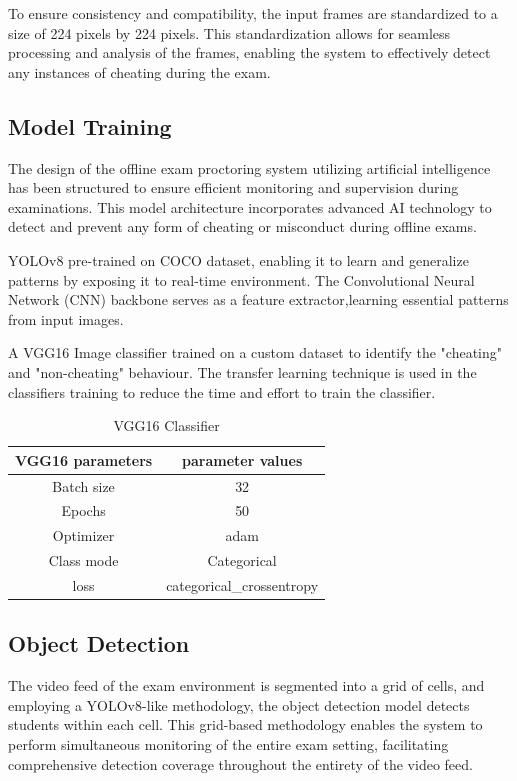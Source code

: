 \documentclass[conference]{IEEEtran}
\begin{document}
To ensure consistency and compatibility, the input frames are standardized to a size of 224 pixels by 224 pixels. This standardization allows for seamless processing and analysis of the frames, enabling the system to effectively detect any instances of cheating during the exam.


\subsection{Model Training}
The design of the offline exam proctoring system utilizing artificial intelligence has been structured to ensure efficient monitoring and supervision during examinations. This model architecture incorporates advanced AI technology to detect and prevent any form of cheating or misconduct during offline exams.

YOLOv8 pre-trained on COCO dataset, enabling it to learn and generalize patterns by exposing it to real-time environment. The Convolutional Neural Network (CNN) backbone serves as a feature extractor,learning essential patterns from input images.

A VGG16 Image classifier trained on a custom dataset to identify the "cheating" and "non-cheating" behaviour. The transfer learning technique is used in the classifiers training to reduce the time and effort to train the classifier.
\begin{table}[htbp]
\caption{VGG16 Classifier}
\label{tab2} %
\begin{center}
\begin{tabular}{|c|c|}
\hline
\textbf{VGG16 parameters} & \textbf{parameter values} \\ %
\hline
Batch size & 32 \\ %
\hline
Epochs& 50 \\
\hline
Optimizer& adam\\
\hline
Class mode& Categorical\\
\hline
loss & categorical\_crossentropy \\

\hline
\end{tabular}
\end{center}
\end{table}





\subsection{Object Detection}
The video feed of the exam environment is segmented into a grid of cells, and employing a YOLOv8-like methodology, the object detection model detects students within each cell. This grid-based methodology enables the system to perform simultaneous monitoring of the entire exam setting, facilitating comprehensive detection coverage throughout the entirety of the video feed.
\end{document}
